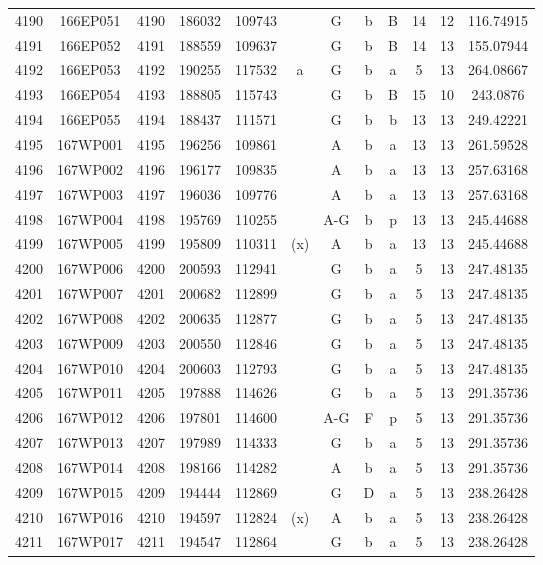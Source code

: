 \begin{tabular}{|*{12}{c|}}
4190 & 166EP051 & 4190 & 186032 & 109743 &  & G & b & B & 14 & 12 & 116.74915 \\ 
4191 & 166EP052 & 4191 & 188559 & 109637 &  & G & b & B & 14 & 13 & 155.07944 \\ 
4192 & 166EP053 & 4192 & 190255 & 117532 & a & G & b & a & 5 & 13 & 264.08667 \\ 
4193 & 166EP054 & 4193 & 188805 & 115743 &  & G & b & B & 15 & 10 & 243.0876 \\ 
4194 & 166EP055 & 4194 & 188437 & 111571 &  & G & b & b & 13 & 13 & 249.42221 \\ 
4195 & 167WP001 & 4195 & 196256 & 109861 &  & A & b & a & 13 & 13 & 261.59528 \\ 
4196 & 167WP002 & 4196 & 196177 & 109835 &  & A & b & a & 13 & 13 & 257.63168 \\ 
4197 & 167WP003 & 4197 & 196036 & 109776 &  & A & b & a & 13 & 13 & 257.63168 \\ 
4198 & 167WP004 & 4198 & 195769 & 110255 &  & A-G & b & p & 13 & 13 & 245.44688 \\ 
4199 & 167WP005 & 4199 & 195809 & 110311 & (x) & A & b & a & 13 & 13 & 245.44688 \\ 
4200 & 167WP006 & 4200 & 200593 & 112941 &  & G & b & a & 5 & 13 & 247.48135 \\ 
4201 & 167WP007 & 4201 & 200682 & 112899 &  & G & b & a & 5 & 13 & 247.48135 \\ 
4202 & 167WP008 & 4202 & 200635 & 112877 &  & G & b & a & 5 & 13 & 247.48135 \\ 
4203 & 167WP009 & 4203 & 200550 & 112846 &  & G & b & a & 5 & 13 & 247.48135 \\ 
4204 & 167WP010 & 4204 & 200603 & 112793 &  & G & b & a & 5 & 13 & 247.48135 \\ 
4205 & 167WP011 & 4205 & 197888 & 114626 &  & G & b & a & 5 & 13 & 291.35736 \\ 
4206 & 167WP012 & 4206 & 197801 & 114600 &  & A-G & F & p & 5 & 13 & 291.35736 \\ 
4207 & 167WP013 & 4207 & 197989 & 114333 &  & G & b & a & 5 & 13 & 291.35736 \\ 
4208 & 167WP014 & 4208 & 198166 & 114282 &  & A & b & a & 5 & 13 & 291.35736 \\ 
4209 & 167WP015 & 4209 & 194444 & 112869 &  & G & D & a & 5 & 13 & 238.26428 \\ 
4210 & 167WP016 & 4210 & 194597 & 112824 & (x) & A & b & a & 5 & 13 & 238.26428 \\ 
4211 & 167WP017 & 4211 & 194547 & 112864 &  & G & b & a & 5 & 13 & 238.26428 \\ 

\end{tabular}
